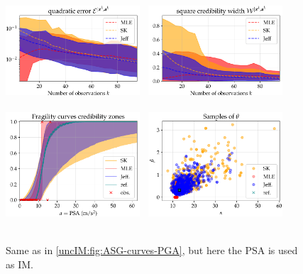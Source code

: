         
    \begin{figure}[!h]
        \centering
        {\includegraphics[width=5cm]{figures/uncIM/err_quadra_ASG_PSA.pdf}}\ %
        {\includegraphics[width=5cm]{figures/uncIM/err_cred_ASG_PSA.pdf}} \\
        \ \\
        {\includegraphics[width=5cm]{figures/uncIM/curves_ASG_PSA.pdf}}\ %
         {\includegraphics[width=5cm]{figures/uncIM/scatter_ASG_PSA.pdf}}\\
         \ \\[-8pt]
         \caption{Same as in \cref{uncIM:fig:ASG-curves-PGA}, but here the PSA is used as IM.}
           \label{uncIM:fig:ASG-curves-SA}
    \end{figure}


